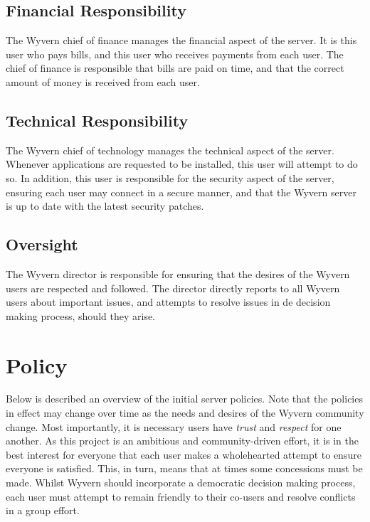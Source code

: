 \documentclass[a4paper]{article}
\begin{document}
\subsection{Financial Responsibility}
The Wyvern chief of finance manages the financial aspect of the server. It is this user who pays bills, and this user who receives payments from each user. The chief of finance is responsible that bills are paid on time, and that the correct amount of money is received from each user.

\subsection{Technical Responsibility}
The Wyvern chief of technology manages the technical aspect of the server. Whenever applications are requested to be installed, this user will attempt to do so. In addition, this user is responsible for the security aspect of the server, ensuring each user may connect in a secure manner, and that the Wyvern server is up to date with the latest security patches.

\subsection{Oversight}
The Wyvern director is responsible for ensuring that the desires of the Wyvern users are respected and followed. The director directly reports to all Wyvern users about important issues, and attempts to resolve issues in de decision making process, should they arise.

\section{Policy}
\label{sec:policy}
Below is described an overview of the initial server policies. Note that the policies in effect may change over time as the needs and desires of the Wyvern community change. Most importantly, it is necessary users have \textit{trust} and \textit{respect} for one another. As this project is an ambitious and community-driven effort, it is in the best interest for everyone that each user makes a wholehearted attempt to ensure everyone is satisfied. This, in turn, means that at times some concessions must be made. Whilst Wyvern should incorporate a democratic decision making process, each user must attempt to remain friendly to their co-users and resolve conflicts in a group effort.
\end{document}
